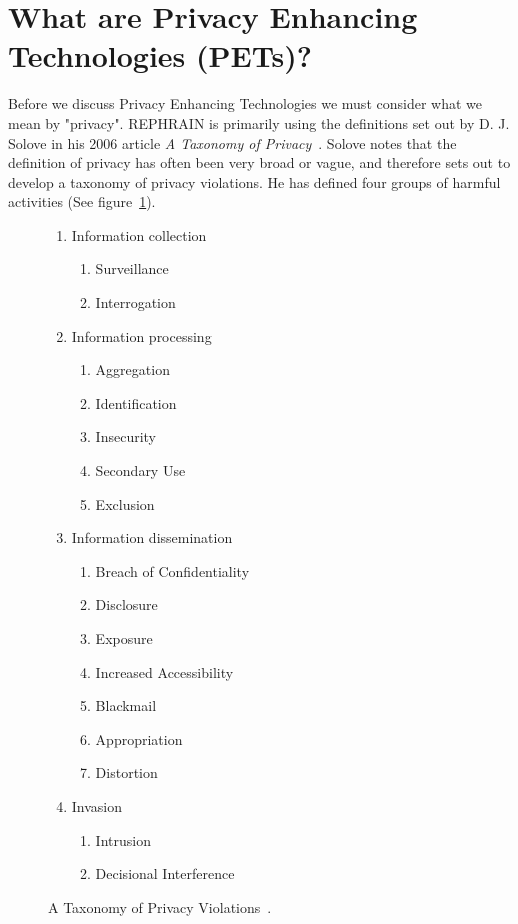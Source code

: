 \documentclass[
    author={Jacob Daniel Halsey},
    supervisor={Prof. Awais Rashid},
    degree={BSc},
    title={Building a Testbed for Evaluating Privacy Enhancing Technologies  (PETs)},
    subtitle={},
    type={software development},
    year={2021}
]{dissertation}
\begin{document}
\section{What are Privacy Enhancing Technologies (PETs)?}

Before we discuss Privacy Enhancing Technologies we must consider what we mean by "privacy". REPHRAIN is 
primarily using the definitions set out by D. J. Solove in his
2006 article \emph{A Taxonomy of Privacy}~\cites{solove_privacy}{rephrain_harms}. Solove notes that the
definition of privacy has often been very broad or vague, and therefore sets out to develop
a taxonomy of privacy violations. He has defined four groups of harmful activities (See figure~\ref{privacy_taxonomy}). \\

\begin{figure}
\centering
\parbox{7cm}{
	\begin{enumerate}
		\item Information collection
		\begin{enumerate}
			\item Surveillance
			\item Interrogation 
		\end{enumerate}
		\item Information processing
		\begin{enumerate}
			\item Aggregation
			\item Identification
			\item Insecurity
			\item Secondary Use
			\item Exclusion
		\end{enumerate}
	\end{enumerate}
}
\qquad
	\begin{minipage}{7cm}
		\begin{enumerate}
			\setcounter{enumi}{2}
			\item Information  dissemination
			\begin{enumerate}
				\item Breach of Confidentiality
				\item Disclosure
				\item Exposure
				\item Increased Accessibility
				\item Blackmail
				\item Appropriation
				\item Distortion
			\end{enumerate}
			\item Invasion
			\begin{enumerate}
				\item Intrusion
				\item Decisional Interference
			\end{enumerate} 
		\end{enumerate}
	\end{minipage}
	\caption{A Taxonomy of Privacy Violations~\cite{solove_privacy}.}
	\label{privacy_taxonomy}
\end{figure}
\end{document}
